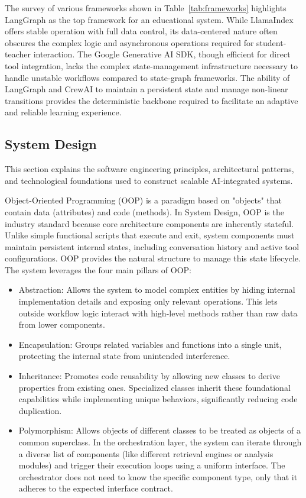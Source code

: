 

The survey of various frameworks shown in Table~\ref{tab:frameworks} highlights LangGraph as the top framework for an educational system. While LlamaIndex offers stable operation with full data control, its data-centered nature often obscures the complex logic and asynchronous operations required for student-teacher interaction. The Google Generative AI SDK, though efficient for direct tool integration, lacks the complex state-management infrastructure necessary to handle unstable workflows compared to state-graph frameworks. The ability of LangGraph and CrewAI to maintain a persistent state and manage non-linear transitions provides the deterministic backbone required to facilitate an adaptive and reliable learning experience.
\subsection{System Design}

This section explains the software engineering principles, architectural patterns, and technological foundations used to construct scalable AI-integrated systems. 

Object-Oriented Programming (OOP) is a paradigm based on "objects" that contain data (attributes) and code (methods). In System Design, OOP is the industry standard because core architecture components are inherently stateful. Unlike simple functional scripts that execute and exit, system components must maintain persistent internal states, including conversation history and active tool configurations. OOP provides the natural structure to manage this state lifecycle. The system leverages the four main pillars of OOP:

\begin{itemize}
    \item {Abstraction:} Allows the system to model complex entities by hiding internal implementation details and exposing only relevant operations. This lets outside workflow logic interact with high-level methods rather than raw data from lower components.
    
    \item {Encapsulation:} Groups related variables and functions into a single unit, protecting the internal state from unintended interference.

    \item {Inheritance:} Promotes code reusability by allowing new classes to derive properties from existing ones. Specialized classes inherit these foundational capabilities while implementing unique behaviors, significantly reducing code duplication.

    \item {Polymorphism:} Allows objects of different classes to be treated as objects of a common superclass. In the orchestration layer, the system can iterate through a diverse list of components (like different retrieval engines or analysis modules) and trigger their execution loops using a uniform interface. The orchestrator does not need to know the specific component type, only that it adheres to the expected interface contract.
\end{itemize}

